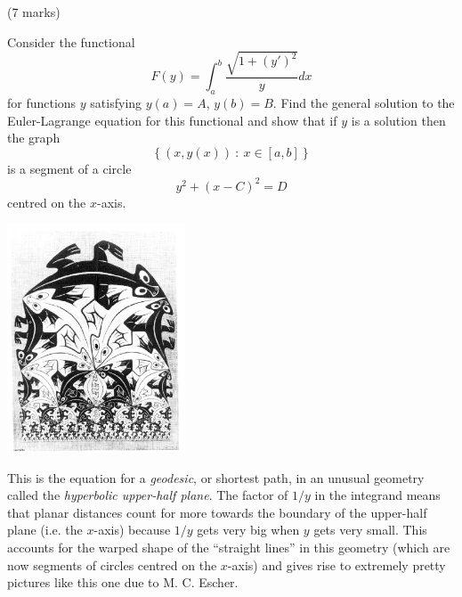 \documentclass[12pt]{article}
\begin{document}
\newpage

\bigskip

\begin{question}(7 marks)\\
\begin{multicols}{2}
Consider the functional
\[F(y)=\int_a^b\frac{\sqrt{1+(y')^2}}{y}dx\]
for functions $y$ satisfying $y(a)=A$, $y(b)=B$. Find the general solution to the Euler-Lagrange equation for this functional and show that if $y$ is a solution then the graph
\[\left\{(x,y(x))\ :\ x\in[a,b]\right\}\]
is a segment of a circle
\[y^2+(x-C)^2=D\]
centred on the $x$-axis.

\begin{center}
\includegraphics[width=150pt]{lizards.jpg}
\end{center}
\end{multicols}

\begin{rmk}
This is the equation for a {\em geodesic}, or shortest path, in an unusual geometry called the {\em hyperbolic upper-half plane}. The factor of $1/y$ in the integrand means that planar distances count for more towards the boundary of the upper-half plane (i.e. the $x$-axis) because $1/y$ gets very big when $y$ gets very small. This accounts for the warped shape of the ``straight lines'' in this geometry (which are now segments of circles centred on the $x$-axis) and gives rise to extremely pretty pictures like this one due to M. C. Escher.
\end{rmk}

\end{question}
\end{document}
